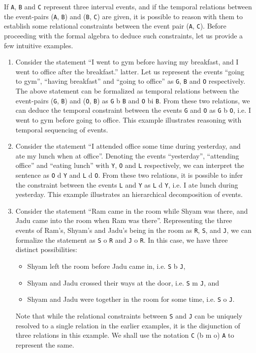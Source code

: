 If \texttt{A}, \texttt{B} and \texttt{C} represent three interval events, and if the temporal relations between the event-pairs 
(\texttt{A}, \texttt{B}) and (\texttt{B}, \texttt{C}) are given, it is possible to reason with them to establish some relational 
constraints between the event pair (\texttt{A}, \texttt{C}). Before proceeding with the formal algebra to deduce such constraints, 
let us provide a few intuitive examples. 
\begin{enumerate}
	\item Consider the statement ``I went to gym before having my breakfast, and I went to office after the breakfast.''
		latter. Let us represent the events ``going to gym'', ``having breakfast'' and ``going to office'' as \texttt{G}, 
		\texttt{B} and \texttt{O} respectively. The above statement can be formalized as temporal relations between the 
		event-pairs (\texttt{G}, \texttt{B}) and (\texttt{O}, \texttt{B}) as \texttt{G} b \texttt{B} and 
		\texttt{O} bi \texttt{B}. 
		From these two relations, we can deduce the temporal constraint between the events \texttt{G} and \texttt{O} 
		as \texttt{G} b \texttt{O}, i.e. I went to gym before going to office. This example illustrates reasoning with 
		temporal sequencing of events.
	\item Consider the statement ``I attended office some time during yesterday, and ate my lunch when at office''. Denoting 
		the events ``yesterday'', ``attending office'' and ``eating lunch'' with \texttt{Y}, \texttt{O} and \texttt{L} 
		respectively, we can interpret the sentence as \texttt{O} d \texttt{Y} and \texttt{L} d \texttt{O}. 
		From these two relations, it is possible to infer the constraint between the events \texttt{L} and \texttt{Y} 
		as \texttt{L} d \texttt{Y}, i.e. I ate lunch during yesterday. This example illustrates an hierarchical 
		decomposition of events.
	\item Consider the statement ``Ram came in the room while Shyam was there, and Jadu came into the room when Ram
		was there''. Representing the three events of Ram's, Shyam's and Jadu's being in the room as \texttt{R},
		\texttt{S}, and \texttt{J}, we can formalize the statement as \texttt{S} o \texttt{R} and \texttt{J} o \texttt{R}.
		In this case, we have three distinct possibilities: 
		\begin{itemize}
			\item Shyam left the room before Jadu came in, i.e. \texttt{S} b \texttt{J}, 
			\item Shyam and Jadu crossed their ways at the door, i.e. \texttt{S} m \texttt{J}, and 
			\item Shyam and Jadu were together in the room for some time, i.e. \texttt{S} o \texttt{J}. 
		\end{itemize}
		Note that while the relational constraints between \texttt{S} and \texttt{J} can be uniquely resolved to a single
		relation in the earlier examples, it is the disjunction of three relations in this example. We shall use the notation 
		\texttt{C} (b m o) \texttt{A} to represent the same.
\end{enumerate}


